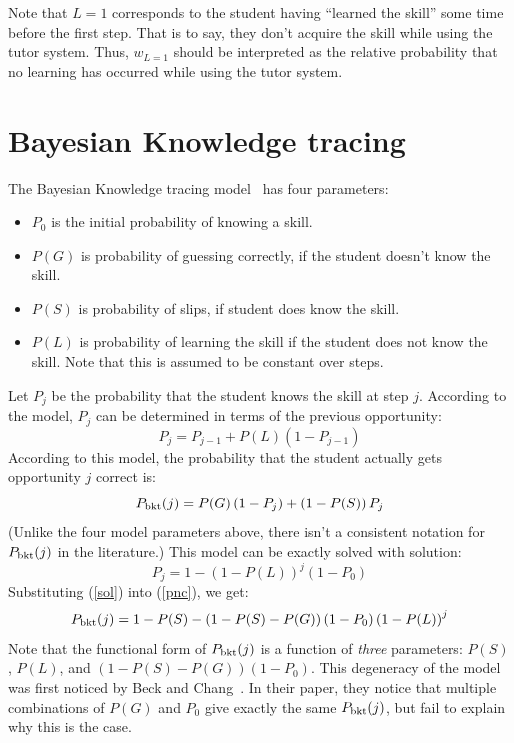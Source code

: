 \documentclass[11pt,letterpaper]{article}
\begin{document}
Note that $L=1$ corresponds to the student having ``learned the skill'' 
some time before the first step.  That is to say, they don't acquire 
the skill while using the tutor system.
Thus, $w_{L=1}$ should be interpreted as the relative probability
that no learning has occurred while using the tutor system.




\appendix
\section{Bayesian Knowledge tracing}
\label{bkt}

The Bayesian Knowledge tracing model~\cite{anderson} has four parameters:
%
\begin{itemize}
   \item $P_0$ is the initial probability of knowing a skill.
   \item $P(G)$ is probability of guessing correctly, if the student        
         doesn't know the skill.
   \item $P(S)$ is probability of slips, if student does know the skill.
   \item $P(L)$ is probability of learning the skill if the student 
         does not know the skill.  Note that this is assumed to 
         be constant over steps.
\end{itemize}
%
Let $P_j$ be the probability that the student knows the skill at 
step $j$. According to the model,  $P_j$ can
be determined in terms of the previous opportunity:
%
\begin{equation}
          P_j = P_{j-1} + P(L)\left(1-P_{j-1}\right)
\end{equation}
%
According to this model, the probability that the student actually gets
opportunity $j$ correct is:
%
\begin{equation}
        P_{\rm bkt}(j) = P(G)\left(1-P_j\right) + 
                     \left(1-P(S)\right) P_j \label{pnc}
\end{equation}
%
(Unlike the four model parameters above, there isn't a consistent
notation for $P_{\rm bkt}(j)$ in the literature.)
This model can be exactly solved with solution: 
%
\begin{equation}
            P_j = 1-\left(1-P(L)\right)^j\left(1-P_0\right)
	    \label{sol}
\end{equation}
%
%
Substituting (\ref{sol}) into (\ref{pnc}), we get:
%
\begin{equation}
         P_{\rm bkt}(j) = 1-P(S) -\left(1-P(S)-P(G)\right) \left(1-P_0\right)
                   \left(1-P(L)\right)^j \label{pncsoln}
\end{equation}
%
Note that the functional form of $P_{\rm bkt}(j)$ is a function of {\em three}
parameters:  $P(S)$, $P(L)$, and $\left(1-P(S)-P(G)\right) \left(1-P_0\right)$.
This degeneracy of the model was first noticed by Beck and 
Chang~\cite{beckchang}.  In their paper, they notice that multiple
combinations of $P(G)$ and $P_0$ give exactly the same $P_{\rm bkt}(j)$, but
fail to explain why this is the case.
\end{document}

